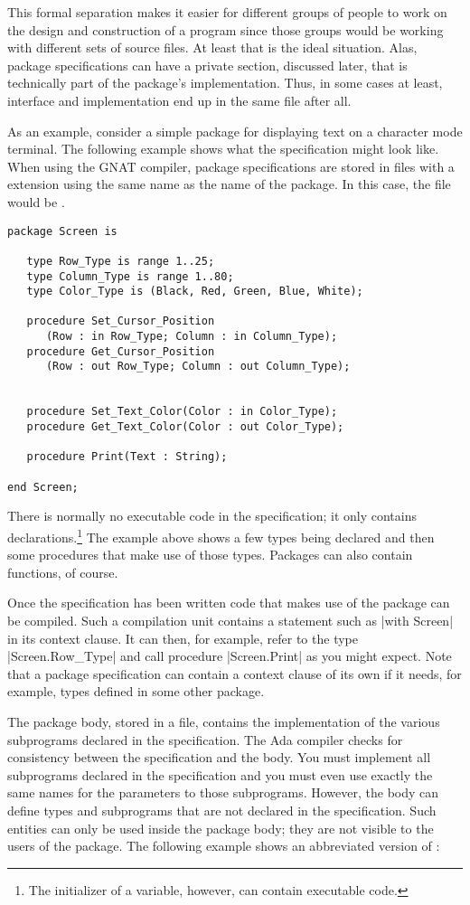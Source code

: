 This formal separation makes it easier for different groups of people to work on the design and
construction of a program since those groups would be working with different sets of source
files. At least that is the ideal situation. Alas, package specifications can have a private
section, discussed later, that is technically part of the package's implementation. Thus, in
some cases at least, interface and implementation end up in the same file after all.

As an example, consider a simple package for displaying text on a character mode terminal. The
following example shows what the specification might look like. When using the GNAT compiler,
package specifications are stored in files with a  extension using the same name
as the name of the package. In this case, the file would be .

\begin{lstlisting}
package Screen is

   type Row_Type is range 1..25;
   type Column_Type is range 1..80;
   type Color_Type is (Black, Red, Green, Blue, White);

   procedure Set_Cursor_Position
      (Row : in Row_Type; Column : in Column_Type);
   procedure Get_Cursor_Position
      (Row : out Row_Type; Column : out Column_Type);


   procedure Set_Text_Color(Color : in Color_Type);
   procedure Get_Text_Color(Color : out Color_Type);

   procedure Print(Text : String);

end Screen;
\end{lstlisting}

There is normally no executable code in the specification; it only contains
declarations.\footnote{The initializer of a variable, however, can contain executable code.} The
example above shows a few types being declared and then some procedures that make use of those
types. Packages can also contain functions, of course.

Once the specification has been written code that makes use of the package can be compiled. Such
a compilation unit contains a statement such as |with Screen| in its context clause. It can
then, for example, refer to the type |Screen.Row_Type| and call procedure |Screen.Print| as you
might expect. Note that a package specification can contain a context clause of its own if it
needs, for example, types defined in some other package.

The package body, stored in a  file, contains the implementation of the various
subprograms declared in the specification. The Ada compiler checks for consistency between the
specification and the body. You must implement all subprograms declared in the specification and
you must even use exactly the same names for the parameters to those subprograms. However,
the body can define types and subprograms that are not declared in the specification. Such
entities can only be used inside the package body; they are not visible to the users of the
package. The following example shows an abbreviated version of :

